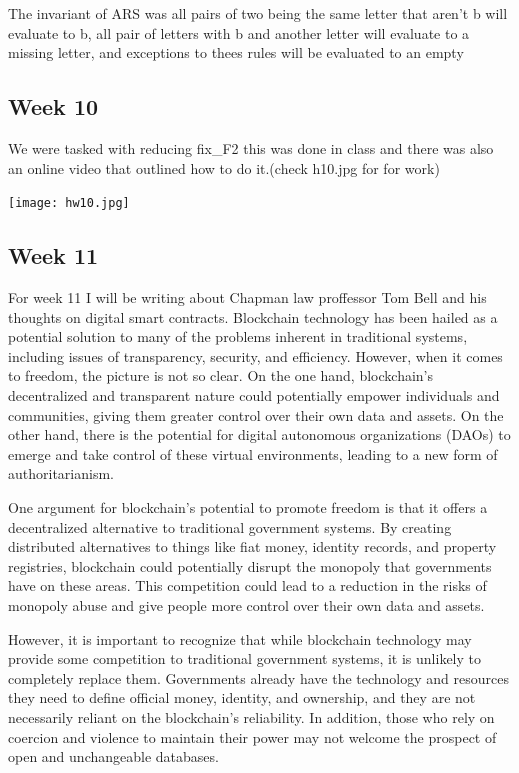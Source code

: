 \documentclass{article}
\theoremstyle{theorem}
\theoremstyle{definition}
\theoremstyle{remark}
\begin{document}
The invariant of ARS was all pairs of two being the same letter that aren't b will evaluate to b, all pair of letters with b and another letter will evaluate to a missing letter, and exceptions to thees rules will be evaluated to an empty
\subsection{Week 10}
    We were tasked with reducing fix\_F2 this was done in class and there was also an online video that outlined how to do it.(check h10.jpg for for work)
\begin{center}
\texttt{[image: hw10.jpg]}
\end{center}
\subsection{Week 11}
For week 11 I will be writing about Chapman law proffessor Tom Bell and his thoughts on digital smart contracts. 
Blockchain technology has been hailed as a potential solution to many of the problems inherent in traditional systems, including issues of transparency, security, and efficiency. However, when it comes to freedom, the picture is not so clear. On the one hand, blockchain's decentralized and transparent nature could potentially empower individuals and communities, giving them greater control over their own data and assets. On the other hand, there is the potential for digital autonomous organizations (DAOs) to emerge and take control of these virtual environments, leading to a new form of authoritarianism.

One argument for blockchain's potential to promote freedom is that it offers a decentralized alternative to traditional government systems. By creating distributed alternatives to things like fiat money, identity records, and property registries, blockchain could potentially disrupt the monopoly that governments have on these areas. This competition could lead to a reduction in the risks of monopoly abuse and give people more control over their own data and assets.

However, it is important to recognize that while blockchain technology may provide some competition to traditional government systems, it is unlikely to completely replace them. Governments already have the technology and resources they need to define official money, identity, and ownership, and they are not necessarily reliant on the blockchain's reliability. In addition, those who rely on coercion and violence to maintain their power may not welcome the prospect of open and unchangeable databases.
\end{document}
